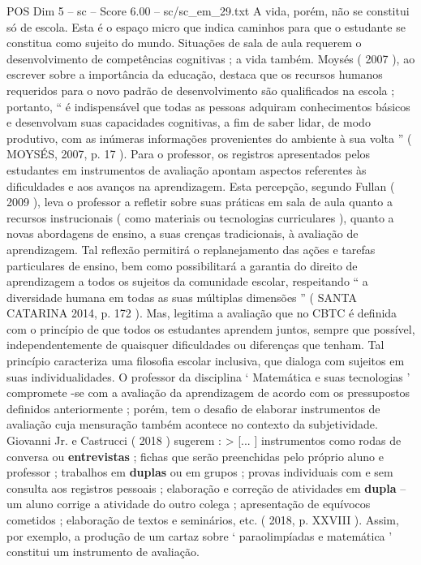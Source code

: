\begin{textsample}{POS Dim 5 – sc – Score 6.00 – sc/sc\_em\_29.txt}
A vida, porém, não se constitui só de escola.
Esta é o espaço micro que indica caminhos para que o estudante se constitua como sujeito do mundo.
Situações de sala de aula requerem o desenvolvimento de competências cognitivas ; a vida também.
Moysés ( 2007 ), ao escrever sobre a importância da educação, destaca que os recursos humanos requeridos para o novo padrão de desenvolvimento são qualificados na escola ; portanto, “ é indispensável que todas as pessoas adquiram conhecimentos básicos e desenvolvam suas capacidades cognitivas, a fim de saber lidar, de modo produtivo, com as inúmeras informações provenientes do ambiente à sua volta ” ( MOYSÉS, 2007, p. 17 ).
Para o professor, os registros apresentados pelos estudantes em instrumentos de avaliação apontam aspectos referentes às dificuldades e aos avanços na aprendizagem.
Esta percepção, segundo Fullan ( 2009 ), leva o professor a refletir sobre suas práticas em sala de aula quanto a recursos instrucionais ( como materiais ou tecnologias curriculares ), quanto a novas abordagens de ensino, a suas crenças tradicionais, à avaliação de aprendizagem.
Tal reflexão permitirá o replanejamento das ações e tarefas particulares de ensino, bem como possibilitará a garantia do direito de aprendizagem a todos os sujeitos da comunidade escolar, respeitando “ a diversidade humana em todas as suas múltiplas dimensões ” ( SANTA CATARINA 2014, p. 172 ).
Mas, legitima a avaliação que no CBTC é definida com o princípio de que todos os estudantes aprendem juntos, sempre que possível, independentemente de quaisquer dificuldades ou diferenças que tenham.
Tal princípio caracteriza uma filosofia escolar inclusiva, que dialoga com sujeitos em suas individualidades.
O professor da disciplina ‘ Matemática e suas tecnologias ’ compromete -se com a avaliação da aprendizagem de acordo com os pressupostos definidos anteriormente ; porém, tem o desafio de elaborar instrumentos de avaliação cuja mensuração também acontece no contexto da subjetividade.
Giovanni Jr. e Castrucci ( 2018 ) sugerem : > [... ] instrumentos como rodas de conversa ou \textbf{entrevistas} ; fichas que serão preenchidas pelo próprio aluno e professor ; trabalhos em \textbf{duplas} ou em grupos ; provas individuais com e sem consulta aos registros pessoais ; elaboração e correção de atividades em \textbf{dupla} – um aluno corrige a atividade do outro colega ; apresentação de equívocos cometidos ; elaboração de textos e seminários, etc. ( 2018, p.
XXVIII ).
Assim, por exemplo, a produção de um cartaz sobre ‘ paraolimpíadas e matemática ’ constitui um instrumento de avaliação.

\end{textsample}
